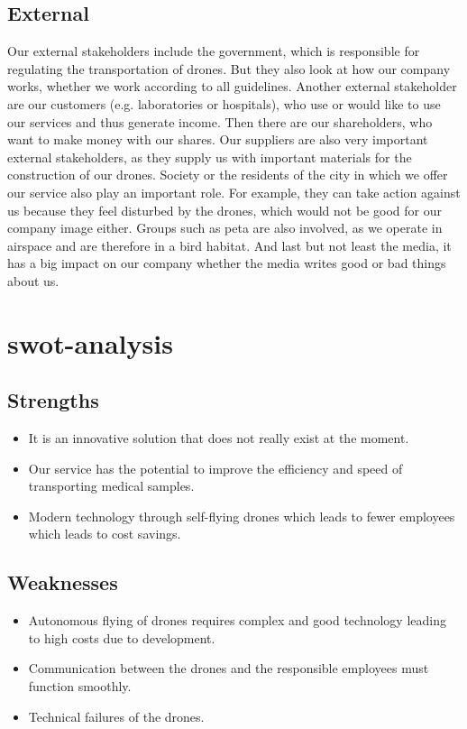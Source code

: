 \subsection{External}
Our external stakeholders include the government, which is responsible for regulating the transportation of drones. But they also look at how our company works, whether we work according to all guidelines.
\newline
Another external stakeholder are our customers (e.g. laboratories or hospitals), who use or would like to use our services and thus generate income. Then there are our shareholders, who want to make money with our shares.
\newline
Our suppliers are also very important external stakeholders, as they supply us with important materials for the construction of our drones. Society or the residents of the city in which we offer our service also play an important role. For example, they can take action against us because they feel disturbed by the drones, which would not be good for our company image either. Groups such as \acs{peta} are also involved, as we operate in airspace and are therefore in a bird habitat. And last but not least the media, it has a big impact on our company whether the media writes good or bad things about us.
\section{\acs{swot}-analysis}
\subsection{Strengths}
\begin{itemize}
  \item It is an innovative solution that does not really exist at the moment.
  \item Our service has the potential to improve the efficiency and speed of transporting medical samples.
  \item Modern technology through self-flying drones which leads to fewer employees which leads to cost savings.
\end{itemize}
\subsection{Weaknesses}
\begin{itemize}
  \item Autonomous flying of drones requires complex and good technology leading to high costs due to development.
  \item Communication between the drones and the responsible employees must function smoothly.
  \item Technical failures of the drones.
\end{itemize}
